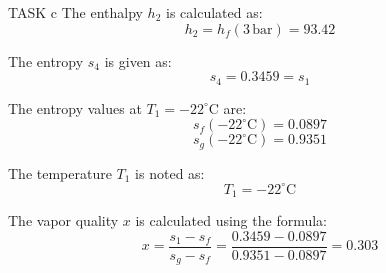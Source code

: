 TASK c  
The enthalpy \( h_2 \) is calculated as:  
\[
h_2 = h_f(3 \, \text{bar}) = 93.42
\]

The entropy \( s_4 \) is given as:  
\[
s_4 = 0.3459 = s_1
\]

The entropy values at \( T_1 = -22^\circ\text{C} \) are:  
\[
s_f(-22^\circ\text{C}) = 0.0897
\]
\[
s_g(-22^\circ\text{C}) = 0.9351
\]

The temperature \( T_1 \) is noted as:  
\[
T_1 = -22^\circ\text{C}
\]

The vapor quality \( x \) is calculated using the formula:  
\[
x = \frac{s_1 - s_f}{s_g - s_f} = \frac{0.3459 - 0.0897}{0.9351 - 0.0897} = 0.303
\]